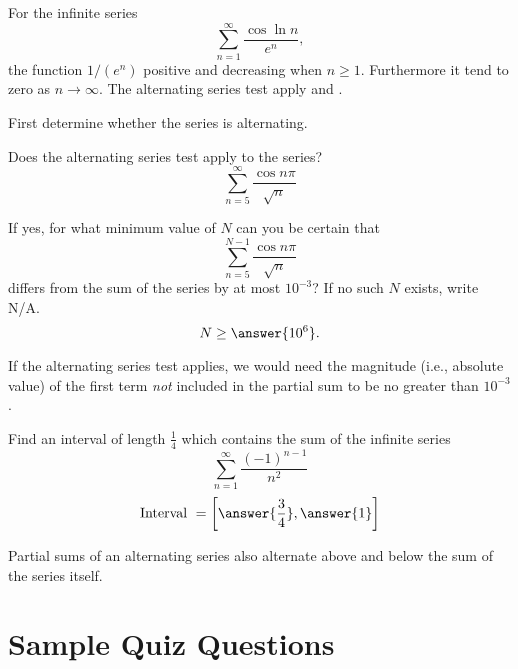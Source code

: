 \documentclass{ximera}
\begin{document}
\begin{exercise}
For the infinite series
\[ \sum_{n=1}^\infty \frac{\cos \ln n}{ e^n}, \]
the function $1/(e^n)$  positive and  decreasing when $n \geq 1$. Furthermore it  tend to zero as $n \rightarrow \infty$. The alternating series test  apply and .
\begin{hint}
First determine whether the series is alternating.
\end{hint}
\end{exercise}


\begin{exercise}
Does the alternating series test apply to the series?
\[ \sum_{n=5}^\infty \frac{\cos n \pi}{ \sqrt{n}} \]
\begin{multipleChoice}
\end{multipleChoice}
If yes, for what minimum value of $N$ can you be certain that
\[ \sum_{n=5}^{N-1} \frac{\cos n \pi}{\sqrt{n}} \]
differs from the sum of the series by at most $10^{-3}$? If no such $N$ exists, write N/A.
\[ N \geq \answer{10^{6}}. \]
\begin{hint}
If the alternating series test applies, we would need the magnitude (i.e., absolute value) of the first term \textit{not} included in the partial sum to be no greater than $10^{-3}$.
\end{hint}
\end{exercise}

\begin{exercise}
Find an interval of length $\frac{1}{4}$ which contains the sum of the infinite series
\[ \sum_{n=1}^\infty \frac{(-1)^{n-1}}{n^2} \]
\[ \text{Interval }  = \left[ \answer{\frac{3}{4}}, \answer{1} \right] \]
\begin{hint}
Partial sums of an alternating series also alternate above and below the sum of the series itself.
\end{hint}
\end{exercise}


\section*{Sample Quiz Questions}
\end{document}
